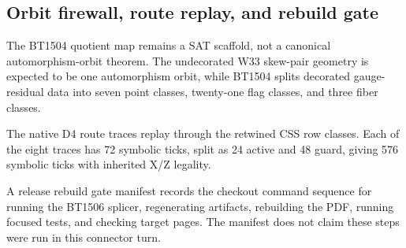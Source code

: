 \subsection{Orbit firewall, route replay, and rebuild gate}
\label{sec:bt1507-bt1509-orbit-css-rebuild-gate}

The BT1504 quotient map remains a SAT scaffold, not a canonical automorphism-orbit theorem.  The undecorated W33 skew-pair geometry is expected to be one automorphism orbit, while BT1504 splits decorated gauge-residual data into seven point classes, twenty-one flag classes, and three fiber classes.

The native D4 route traces replay through the retwined CSS row classes.  Each of the eight traces has 72 symbolic ticks, split as 24 active and 48 guard, giving 576 symbolic ticks with inherited X/Z legality.

A release rebuild gate manifest records the checkout command sequence for running the BT1506 splicer, regenerating artifacts, rebuilding the PDF, running focused tests, and checking target pages.  The manifest does not claim these steps were run in this connector turn.
